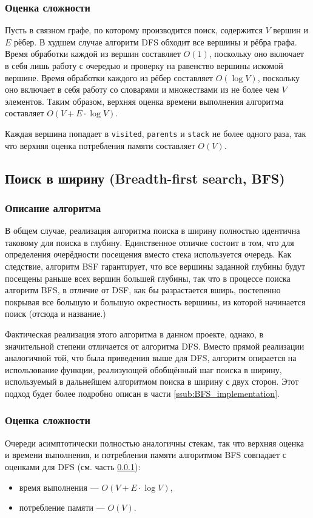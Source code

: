 \documentclass[a4paper, 12pt]{article}
\begin{document}
\subsubsection{Оценка сложности}
\label{ssub:DFS_complexity}
Пусть в связном графе, по которому производится поиск, содержится \({ V }\) вершин и \({ E }\) рёбер. В худшем случае алгоритм DFS обходит все вершины и рёбра графа. Время обработки каждой из вершин составляет \({ O(1) }\), поскольку оно включает в себя лишь работу с очередью и проверку на равенство вершины искомой вершине. Время обработки каждого из рёбер составляет \({ O(\log V) }\), поскольку оно включает в себя работу со словарями и множествами из не более чем \({ V }\) элементов. Таким образом, верхняя оценка времени выполнения алгоритма составляет \({ O(V + E \cdot \log V) }\).

Каждая вершина попадает в \verb|visited|, \verb|parents| и \verb|stack| не более одного раза, так что верхняя оценка потребления памяти составляет \({ O(V) }\).

\subsection{Поиск в ширину (Breadth-first search, BFS)}
\subsubsection{Описание алгоритма}
\label{ssub:BFS_algorithm}
В общем случае, реализация алгоритма поиска в ширину полностью идентична таковому для поиска в глубину. Единственное отличие состоит в том, что для определения очерёдности посещения вместо стека используется очередь. Как следствие, алгоритм BSF гарантирует, что все  вершины заданной глубины будут посещены раньше всех вершин большей глубины, так что в процессе поиска алгоритм BFS, в отличие от DSF, как бы разрастается вширь, постепенно покрывая все большую и большую окрестность вершины, из которой начинается поиск (отсюда и название.)

Фактическая реализация этого алгоритма в данном проекте, однако, в значительной степени отличается от алгоритма DFS. Вместо прямой реализации аналогичной той, что была приведения выше для DFS, алгоритм опирается на использование функции, реализующей обобщённый шаг поиска в ширину, используемый в дальнейшем алгоритмом поиска в ширину с двух сторон. Этот подход будет более подробно описан в части \ref{ssub:BFS_implementation}.

\subsubsection{Оценка сложности}
Очереди асимптотически полностью аналогичны стекам, так что верхняя оценка и времени выполнения, и потребления памяти алгоритмом BFS совпадает с оценками для DFS (см. часть \ref{ssub:DFS_complexity}):
\begin{itemize}
    \item время выполнения --- \({ O(V + E \cdot \log V) }\),
    \item потребление памяти --- \({ O(V) }\).
\end{itemize}
\end{document}
